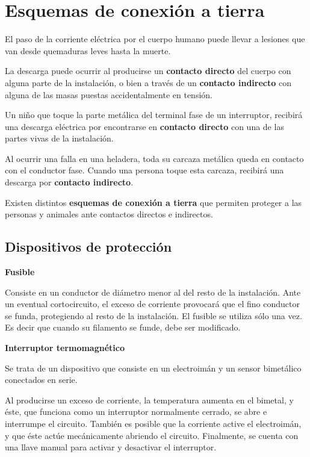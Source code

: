 
\chapter{Esquemas de conexión a tierra}

El paso de la corriente eléctrica por el cuerpo humano puede llevar a lesiones que van desde quemaduras leves hasta la muerte.

La descarga puede ocurrir al producirse un \textbf{contacto directo} del cuerpo con alguna parte de la instalación, o bien a través de un \textbf{contacto indirecto} con alguna de las masas puestas accidentalmente en tensión.

\begin{ejemplo}
	Un niño que toque la parte metálica del terminal fase de un interruptor, recibirá una descarga eléctrica por encontrarse en \textbf{contacto directo} con una de las partes vivas de la instalación.
	
	Al ocurrir una falla en una heladera, toda su carcaza metálica queda en contacto con el conductor fase. Cuando una persona toque esta carcaza, recibirá una descarga por \textbf{contacto indirecto}.
\end{ejemplo}

Existen distintos \textbf{esquemas de conexión a tierra} que permiten proteger a las personas y animales ante contactos directos e indirectos.

\section{Dispositivos de protección}
\textbf{Fusible}

Consiste en un conductor de diámetro menor al del resto de la instalación. Ante un eventual cortocircuito, el exceso de corriente provocará que el fino conductor se funda, protegiendo al resto de la instalación. El fusible se utiliza sólo una vez. Es decir que cuando su filamento se funde, debe ser modificado.

\textbf{Interruptor termomagnético}

Se trata de un dispositivo que consiste en un electroimán y un sensor bimetálico conectados en serie.

Al producirse un exceso de corriente, la temperatura aumenta en el bimetal, y éste, que funciona como un interruptor normalmente cerrado, se abre e interrumpe el circuito. También es posible que la corriente active el electroimán, y que éste actúe mecánicamente abriendo el circuito. Finalmente, se cuenta con una llave manual para activar y desactivar el interruptor.

